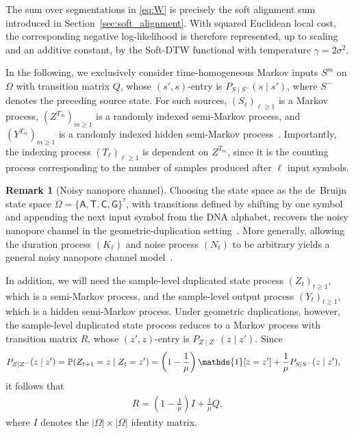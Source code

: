 \documentclass[onecolumn]{IEEEtran}
\theoremstyle{definition}
\newtheorem{remark}{Remark}
\begin{document}
{
The sum over segmentations in \eqref{eq:W} is precisely the soft alignment
sum introduced in Section~\ref{sec:soft_alignment}. With squared Euclidean
local cost, the corresponding negative log-likelihood is therefore represented,
up to scaling and an additive constant, by the Soft-DTW functional with
temperature $\gamma=2\sigma^2$.
}

In the following, we exclusively consider time-homogeneous Markov inputs \(S^m\) on \(\Omega\) with transition matrix \(Q\), whose \((s',s)\)-entry is \(P_{S\mid S^{-}}(s\mid s')\), {where \(S^{-}\) denotes the
preceding source state}. For such sources, \((S_\ell)_{\ell\geq 1}\) is a Markov process, \((Z^{T_m})_{m\geq 1}\) is a randomly indexed semi-Markov process, and \((Y^{T_m})_{m\geq 1}\) is a randomly indexed hidden semi-Markov process~\cite{Girardin2018}. Importantly, the indexing process \((T_\ell)_{\ell\geq 1}\) is dependent on \(Z^{T_m}\), since it is the counting process corresponding to the number of samples produced after \(\ell\) input symbols.

\begin{remark}[Noisy nanopore channel]
Choosing the state space as the de~Bruijn state space \(\Omega=\{\mathsf{A},\mathsf{T},\mathsf{C},\mathsf{G}\}^\tau\), with transitions defined by shifting by one symbol and appending the next input symbol from the DNA alphabet, recovers the noisy nanopore channel in the geometric-duplication setting~\cite{McBain2024a}. More generally, allowing the duration process \((K_\ell)\) and noise process \((N_t)\) to be arbitrary yields a general noisy nanopore channel model~\cite{Rameshwar2025}.
\end{remark}

In addition, we will need the sample-level duplicated state process \((Z_t)_{t\geq 1}\), which is a semi-Markov process, and the sample-level output process \((Y_t)_{t\geq 1}\), which is a hidden semi-Markov process. Under geometric duplications, however, the sample-level duplicated state process reduces to a Markov process with transition matrix \(R\), whose \((z',z)\)-entry is \(P_{Z\mid Z^{-}}(z\mid z')\). Since
\begin{align}
P_{Z\mid Z^{-}}(z\mid z')
&= \mathbb{P}(Z_{t+1}=z\mid Z_t=z') = \left(1-\frac{1}{\mu}\right)\mathds{1}[z=z'] + \frac{1}{\mu} P_{S\mid S^{-}}(z\mid z'),\notag
\end{align}
it follows that
\begin{align}
    R = \left(1-\frac{1}{\mu}\right)I + \frac{1}{\mu}Q,
\end{align}
where \(I\) denotes the \(|\Omega|\times|\Omega|\) identity matrix.
\end{document}

